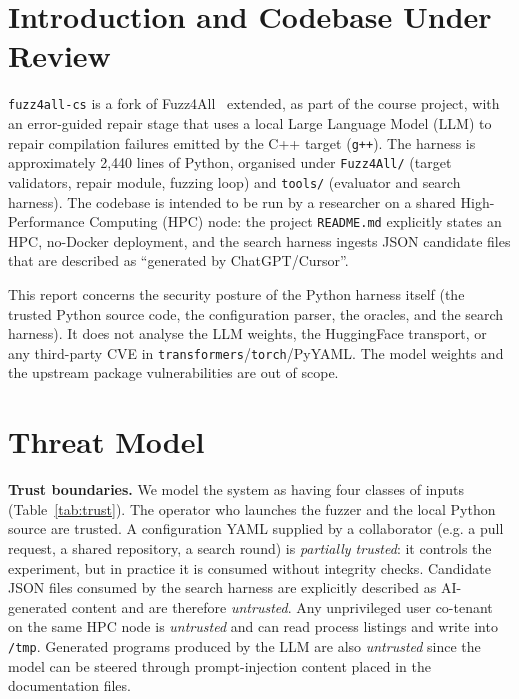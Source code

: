 \documentclass[conference]{IEEEtran}
\begin{document}
\section{Introduction and Codebase Under Review}

\texttt{fuzz4all-cs} is a fork of Fuzz4All~\cite{xia2024fuzz4all} extended,
as part of the course project, with an error-guided repair stage that uses
a local Large Language Model (LLM) to repair compilation failures emitted
by the C++ target (\texttt{g++}). The harness is approximately 2{,}440
lines of Python, organised under
\texttt{Fuzz4All/} (target validators, repair module, fuzzing loop) and
\texttt{tools/} (evaluator and search harness). The codebase is intended to
be run by a researcher on a shared High-Performance Computing (HPC) node:
the project \texttt{README.md} explicitly states an HPC, no-Docker
deployment, and the search harness ingests JSON candidate files that are
described as ``generated by ChatGPT/Cursor''.

This report concerns the security posture of the Python harness itself
(the trusted Python source code, the configuration parser, the
oracles, and the search harness). It does not analyse the LLM weights, the
HuggingFace transport, or any third-party CVE in
\texttt{transformers}/\texttt{torch}/PyYAML. The model weights and the
upstream package vulnerabilities are out of scope.

\section{Threat Model}
\label{sec:threat}

\textbf{Trust boundaries.} We model the system as having four classes of
inputs (Table~\ref{tab:trust}). The operator who launches the fuzzer and
the local Python source are trusted. A configuration YAML supplied by a
collaborator (e.g. a pull request, a shared repository, a search round) is
\emph{partially trusted}: it controls the experiment, but in practice it
is consumed without integrity checks. Candidate JSON files consumed by the
search harness are explicitly described as AI-generated content and are
therefore \emph{untrusted}. Any unprivileged user co-tenant on the same
HPC node is \emph{untrusted} and can read process listings and write into
\texttt{/tmp}. Generated programs produced by the LLM are also
\emph{untrusted} since the model can be steered through prompt-injection
content placed in the documentation files.
\end{document}
